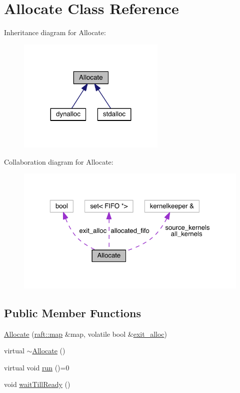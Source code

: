 \hypertarget{class_allocate}{}\section{Allocate Class Reference}
\label{class_allocate}


Inheritance diagram for Allocate\+:
\nopagebreak
\begin{figure}[H]
\begin{center}
\leavevmode
\includegraphics[width=200pt]{class_allocate__inherit__graph}
\end{center}
\end{figure}


Collaboration diagram for Allocate\+:
\nopagebreak
\begin{figure}[H]
\begin{center}
\leavevmode
\includegraphics[width=323pt]{class_allocate__coll__graph}
\end{center}
\end{figure}
\subsection*{Public Member Functions}
\begin{DoxyCompactItemize}
\item 
\hyperlink{class_allocate_ab2b82e7fab9d0fccb9702effec93917b}{Allocate} (\hyperlink{classraft_1_1map}{raft\+::map} \&map, volatile bool \&\hyperlink{class_allocate_a4d10076b88ab1297c89b8a05e117b510}{exit\+\_\+alloc})
\item 
virtual \hyperlink{class_allocate_a68cd61da26f3b82da094b6d3e5d556f5}{$\sim$\+Allocate} ()
\item 
virtual void \hyperlink{class_allocate_a44f9b51c382fec159233609e21b9d272}{run} ()=0
\item 
void \hyperlink{class_allocate_a3123c2c1d9584974ce19b47fe6ceea17}{wait\+Till\+Ready} ()
\end{DoxyCompactItemize}
